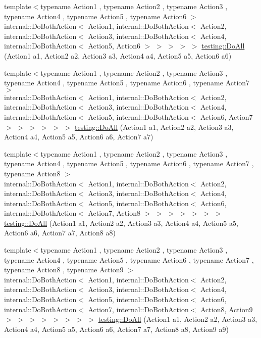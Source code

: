 \begin{DoxyCompactItemize}
\item 
{\footnotesize template$<$typename Action1 , typename Action2 , typename Action3 , typename Action4 , typename Action5 , typename Action6 $>$ }\\internal\+::\+Do\+Both\+Action$<$ Action1, internal\+::\+Do\+Both\+Action$<$ Action2, internal\+::\+Do\+Both\+Action$<$ Action3, internal\+::\+Do\+Both\+Action$<$ Action4, internal\+::\+Do\+Both\+Action$<$ Action5, Action6 $>$ $>$ $>$ $>$ $>$ \mbox{\hyperlink{namespacetesting_aa6c87c8d7520fb333f1559487d3e06e9}{testing\+::\+Do\+All}} (Action1 a1, Action2 a2, Action3 a3, Action4 a4, Action5 a5, Action6 a6)
\item 
{\footnotesize template$<$typename Action1 , typename Action2 , typename Action3 , typename Action4 , typename Action5 , typename Action6 , typename Action7 $>$ }\\internal\+::\+Do\+Both\+Action$<$ Action1, internal\+::\+Do\+Both\+Action$<$ Action2, internal\+::\+Do\+Both\+Action$<$ Action3, internal\+::\+Do\+Both\+Action$<$ Action4, internal\+::\+Do\+Both\+Action$<$ Action5, internal\+::\+Do\+Both\+Action$<$ Action6, Action7 $>$ $>$ $>$ $>$ $>$ $>$ \mbox{\hyperlink{namespacetesting_aadfaf4eb9897dcabe067b1d882febc86}{testing\+::\+Do\+All}} (Action1 a1, Action2 a2, Action3 a3, Action4 a4, Action5 a5, Action6 a6, Action7 a7)
\item 
{\footnotesize template$<$typename Action1 , typename Action2 , typename Action3 , typename Action4 , typename Action5 , typename Action6 , typename Action7 , typename Action8 $>$ }\\internal\+::\+Do\+Both\+Action$<$ Action1, internal\+::\+Do\+Both\+Action$<$ Action2, internal\+::\+Do\+Both\+Action$<$ Action3, internal\+::\+Do\+Both\+Action$<$ Action4, internal\+::\+Do\+Both\+Action$<$ Action5, internal\+::\+Do\+Both\+Action$<$ Action6, internal\+::\+Do\+Both\+Action$<$ Action7, Action8 $>$ $>$ $>$ $>$ $>$ $>$ $>$ \mbox{\hyperlink{namespacetesting_a2c0e69056a8e5bc4ddc2308ba0af5214}{testing\+::\+Do\+All}} (Action1 a1, Action2 a2, Action3 a3, Action4 a4, Action5 a5, Action6 a6, Action7 a7, Action8 a8)
\item 
{\footnotesize template$<$typename Action1 , typename Action2 , typename Action3 , typename Action4 , typename Action5 , typename Action6 , typename Action7 , typename Action8 , typename Action9 $>$ }\\internal\+::\+Do\+Both\+Action$<$ Action1, internal\+::\+Do\+Both\+Action$<$ Action2, internal\+::\+Do\+Both\+Action$<$ Action3, internal\+::\+Do\+Both\+Action$<$ Action4, internal\+::\+Do\+Both\+Action$<$ Action5, internal\+::\+Do\+Both\+Action$<$ Action6, internal\+::\+Do\+Both\+Action$<$ Action7, internal\+::\+Do\+Both\+Action$<$ Action8, Action9 $>$ $>$ $>$ $>$ $>$ $>$ $>$ $>$ \mbox{\hyperlink{namespacetesting_a3479e234532d82d0a093f7ffdb3ac254}{testing\+::\+Do\+All}} (Action1 a1, Action2 a2, Action3 a3, Action4 a4, Action5 a5, Action6 a6, Action7 a7, Action8 a8, Action9 a9)

\end{DoxyCompactItemize}
